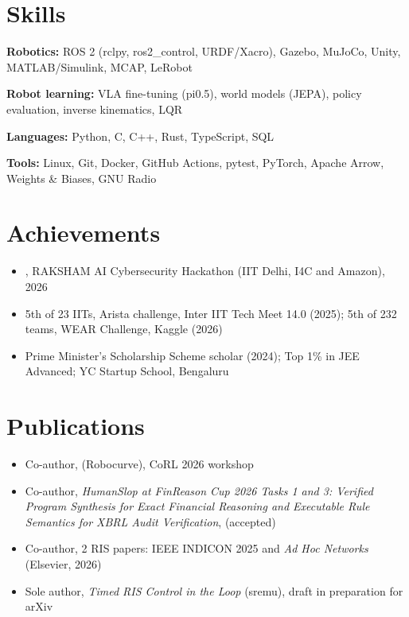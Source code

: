 \documentclass[10pt]{article}
\begin{document}
\section{Skills}
\textbf{Robotics:} ROS 2 (rclpy, ros2\_control, URDF/Xacro), Gazebo, MuJoCo, Unity, MATLAB/Simulink, MCAP, LeRobot\par
\textbf{Robot learning:} VLA fine-tuning (pi0.5), world models (JEPA), policy evaluation, inverse kinematics, LQR\par
\textbf{Languages:} Python, C, C++, Rust, TypeScript, SQL\par
\textbf{Tools:} Linux, Git, Docker, GitHub Actions, pytest, PyTorch, Apache Arrow, Weights \& Biases, GNU Radio\par

\section{Achievements}
\begin{itemize}
\item {}, RAKSHAM AI Cybersecurity Hackathon (IIT Delhi, I4C and Amazon), 2026
\item 5th of 23 IITs, Arista challenge, Inter IIT Tech Meet 14.0 (2025); 5th of 232 teams, WEAR Challenge, Kaggle (2026)
\item Prime Minister's Scholarship Scheme scholar (2024); Top 1\% in JEE Advanced; YC Startup School, Bengaluru
\end{itemize}

\section{Publications}
\begin{itemize}
\item Co-author,  (Robocurve), CoRL 2026 workshop
\item Co-author, \textit{HumanSlop at FinReason Cup 2026 Tasks 1 and 3: Verified Program Synthesis for Exact Financial Reasoning and Executable Rule Semantics for XBRL Audit Verification},  (accepted)
\item Co-author, 2 RIS papers: IEEE INDICON 2025 and \textit{Ad Hoc Networks} (Elsevier, 2026)
\item Sole author, \textit{Timed RIS Control in the Loop} (sremu), draft in preparation for arXiv
\end{itemize}
\end{document}
